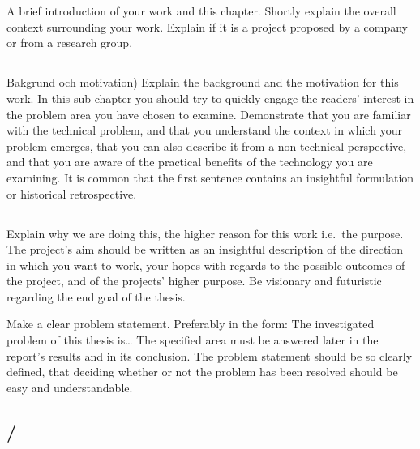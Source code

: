 \section{}\label{sec:intro} 
A brief introduction of your work and this chapter. Shortly explain the overall context surrounding
your work. Explain if it is a project proposed by a company or from a research group.

\subsection{}\label{subsec:background}
\noindent 
Bakgrund och motivation) Explain the background and the motivation for this work. In this
sub-chapter you should try to quickly engage the readers' interest in the problem area you have
chosen to examine. Demonstrate that you are familiar with the technical problem, and that you
understand the context in which your problem emerges, that you can also describe it from a
non-technical perspective, and that you are aware of the practical benefits of the technology you
are examining. It is common that the first sentence contains an insightful formulation or historical
retrospective.  

\subsection{}\label{subsec:aim}
\noindent
Explain why we are doing this, the higher reason for this work i.e.\ the purpose. The project's aim
should be written as an insightful description of the direction in which you want to work, your
hopes with regards to the possible outcomes of the project, and of the projects' higher purpose. Be
visionary and futuristic regarding the end goal of the thesis.

Make a clear problem statement.  Preferably in the form: The investigated problem of this thesis is…
The specified area must be answered later in the report's results and in its conclusion. The problem
statement should be so clearly defined, that deciding whether or not the problem has been resolved
should be easy and understandable.

\subsection{/
            }\label{subsec:researchquestion}

